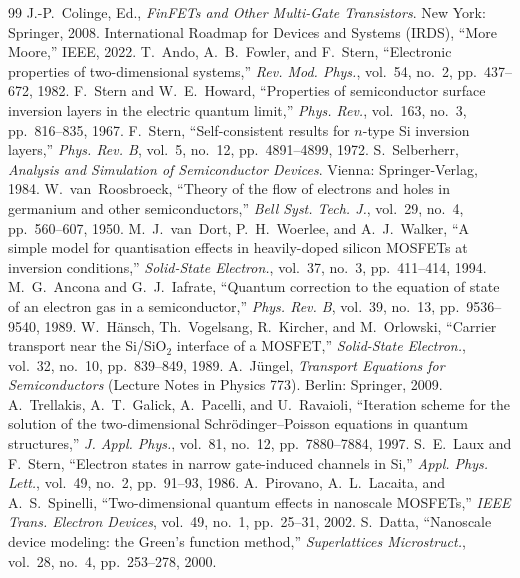 \documentclass[conference]{IEEEtran}
\begin{document}
\begin{thebibliography}{99}
 J.-P.~Colinge, Ed., \emph{FinFETs and Other Multi-Gate
Transistors}. New York: Springer, 2008.
 International Roadmap for Devices and Systems (IRDS), ``More Moore,''
IEEE, 2022.
 T.~Ando, A.~B.~Fowler, and F.~Stern, ``Electronic properties of
two-dimensional systems,'' \emph{Rev. Mod. Phys.}, vol.~54, no.~2, pp.~437--672, 1982.
 F.~Stern and W.~E.~Howard, ``Properties of semiconductor
surface inversion layers in the electric quantum limit,'' \emph{Phys. Rev.},
vol.~163, no.~3, pp.~816--835, 1967.
 F.~Stern, ``Self-consistent results for $n$-type Si inversion
layers,'' \emph{Phys. Rev. B}, vol.~5, no.~12, pp.~4891--4899, 1972.
 S.~Selberherr, \emph{Analysis and Simulation of Semiconductor
Devices}. Vienna: Springer-Verlag, 1984.
 W.~van~Roosbroeck, ``Theory of the flow of electrons and
holes in germanium and other semiconductors,'' \emph{Bell Syst. Tech. J.},
vol.~29, no.~4, pp.~560--607, 1950.
 M.~J.~van~Dort, P.~H.~Woerlee, and A.~J.~Walker, ``A simple model
for quantisation effects in heavily-doped silicon MOSFETs at inversion
conditions,'' \emph{Solid-State Electron.}, vol.~37, no.~3, pp.~411--414, 1994.
 M.~G.~Ancona and G.~J.~Iafrate, ``Quantum correction to the
equation of state of an electron gas in a semiconductor,'' \emph{Phys. Rev. B},
vol.~39, no.~13, pp.~9536--9540, 1989.
 W.~H\"ansch, Th.~Vogelsang, R.~Kircher, and M.~Orlowski,
``Carrier transport near the Si/SiO$_2$ interface of a MOSFET,''
\emph{Solid-State Electron.}, vol.~32, no.~10, pp.~839--849, 1989.
 A.~J\"ungel, \emph{Transport Equations for Semiconductors}
(Lecture Notes in Physics 773). Berlin: Springer, 2009.
 A.~Trellakis, A.~T.~Galick, A.~Pacelli, and U.~Ravaioli,
``Iteration scheme for the solution of the two-dimensional Schr\"odinger--Poisson
equations in quantum structures,'' \emph{J. Appl. Phys.}, vol.~81, no.~12,
pp.~7880--7884, 1997.
 S.~E.~Laux and F.~Stern, ``Electron states in narrow gate-induced
channels in Si,'' \emph{Appl. Phys. Lett.}, vol.~49, no.~2, pp.~91--93, 1986.
 A.~Pirovano, A.~L.~Lacaita, and A.~S.~Spinelli, ``Two-dimensional
quantum effects in nanoscale MOSFETs,'' \emph{IEEE Trans. Electron Devices},
vol.~49, no.~1, pp.~25--31, 2002.
 S.~Datta, ``Nanoscale device modeling: the Green's function
method,'' \emph{Superlattices Microstruct.}, vol.~28, no.~4, pp.~253--278, 2000.

\end{thebibliography}
\end{document}
